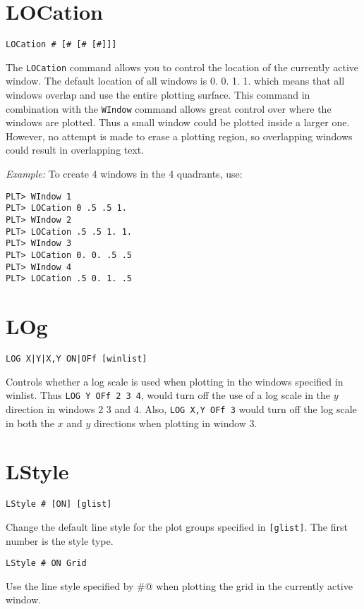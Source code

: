 \section*{LOCation}
\begin{verbatim}
LOCation # [# [# [#]]]
\end{verbatim}
   The {\tt LOCation} command allows you to control the location of
the currently active window.  The default location of all windows
is 0. 0. 1. 1. which means that all windows overlap and use the entire
plotting surface.  This command in combination with the {\tt WIndow}
command allows great control over where the windows are plotted. 
Thus a small window could be plotted inside a larger one.  However,
no attempt is made to erase a plotting region, so overlapping windows
could result in overlapping text.

\medskip\noindent
{\em Example:}
To create 4 windows in the 4 quadrants, use:
\begin{verbatim}
PLT> WIndow 1
PLT> LOCation 0 .5 .5 1.
PLT> WIndow 2
PLT> LOCation .5 .5 1. 1.
PLT> WIndow 3
PLT> LOCation 0. 0. .5 .5
PLT> WIndow 4
PLT> LOCation .5 0. 1. .5
\end{verbatim}

\section*{LOg}
\begin{verbatim}
LOG X|Y|X,Y ON|OFf [winlist]
\end{verbatim}
   Controls whether a log scale is used when plotting in the windows
specified in winlist.  Thus {\tt LOG~Y~OFf~2~3~4}, would turn off the use of
a log scale in the $y$ direction in windows 2 3 and 4.  Also, {\tt LOG~X,Y~OFf~3}
would turn off the log scale in both the $x$ and $y$ directions when
plotting in window 3.

\section*{LStyle}
\begin{verbatim}
LStyle # [ON] [glist]
\end{verbatim}
   Change the default line style for the plot groups specified in
{\tt [glist]}.  The first number is the style type.

\begin{verbatim}
LStyle # ON Grid
\end{verbatim}
  Use the line style specified by \verb@#@ when plotting the grid
in the currently active window.

